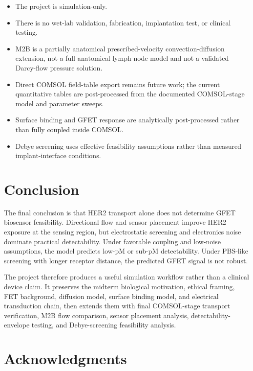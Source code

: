 \documentclass[12pt,a4paper,oneside]{report}
\begin{document}
\begin{itemize}
    \item The project is simulation-only.
    \item There is no wet-lab validation, fabrication, implantation test, or clinical testing.
    \item M2B is a partially anatomical prescribed-velocity convection-diffusion extension, not a full anatomical lymph-node model and not a validated Darcy-flow pressure solution.
    \item Direct COMSOL field-table export remains future work; the current quantitative tables are post-processed from the documented COMSOL-stage model and parameter sweeps.
    \item Surface binding and GFET response are analytically post-processed rather than fully coupled inside COMSOL.
    \item Debye screening uses effective feasibility assumptions rather than measured implant-interface conditions.
\end{itemize}

\chapter{Conclusion}

The final conclusion is that HER2 transport alone does not determine GFET biosensor feasibility. Directional flow and sensor placement improve HER2 exposure at the sensing region, but electrostatic screening and electronics noise dominate practical detectability. Under favorable coupling and low-noise assumptions, the model predicts low-pM or sub-pM detectability. Under PBS-like screening with longer receptor distance, the predicted GFET signal is not robust.

The project therefore produces a useful simulation workflow rather than a clinical device claim. It preserves the midterm biological motivation, ethical framing, FET background, diffusion model, surface binding model, and electrical transduction chain, then extends them with final COMSOL-stage transport verification, M2B flow comparison, sensor placement analysis, detectability-envelope testing, and Debye-screening feasibility analysis.

\chapter*{Acknowledgments}
\end{document}
